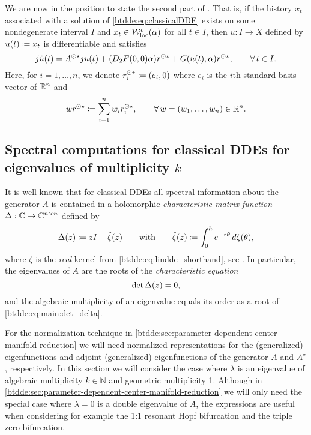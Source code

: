 We are now in the position to state the second part of \cite[Corollary
20]{Switching2019}. That is, if the history $x_t$ associated with a solution
of \cref{btdde:eq:classicalDDE} exists on some nondegenerate interval $I$ and $x_t \in
\mathcal{W}^c_{\text{loc}}(\alpha)$ for all $t \in I$, then $u : I \to X$ defined by $u(t) \coloneqq x_t$
is differentiable and satisfies
\[
  j\dot{u}(t) = A^{\odot\star}ju(t) + (D_2F(0,0)\alpha)r^{\odot\star} 
                    + G(u(t),\alpha)r^{\odot\star}, \qquad \forall\,t \in I.
\]
Here, for $i = 1,\ldots,n$, we denote $r^{\odot\star}_i \coloneqq (e_i, 0)$ where $e_i$ is the
$i$th standard basis vector of $\mathbb{R}^n$ and
\[
  w r^{\odot\star} \coloneqq \sum_{i=1}^n{w_ir^{\odot\star}_i}, \qquad 
    \forall\,w = (w_1,\ldots,w_n) \in \mathbb{R}^n.
\]

\subsection{Spectral computations for classical DDEs for eigenvalues of multiplicity \texorpdfstring{$k$}{k}}
It is well known that for classical DDEs all spectral information about the
generator $A$ is contained in a holomorphic \emph{characteristic matrix
function} $\Delta : \mathbb{C}
\to \mathbb{C}^{n \times n}$ defined by
\begin{equation}
\label{btdde:eq:CharMatrix}
  \Delta(z) \coloneqq zI - \hat{\zeta}(z) 
  \qquad \text{with} 
  \qquad \hat{\zeta}(z) \coloneqq \int_0^h{e^{-z\theta}\,d\zeta(\theta)},
\end{equation}
where $\zeta$ is the \emph{real} kernel from \cref{btdde:eq:lindde_shorthand}, see
\cite[Sections IV.4 and IV.5]{diekmann1995delay}. In particular, the
eigenvalues of $A$ are the roots of the \emph{characteristic equation}
\begin{equation}
  \label{btdde:eq:main:det_delta}
\operatorname{det}{\Delta(z)} = 0,
\end{equation}
and the algebraic multiplicity of an eigenvalue equals its order as a root of
\cref{btdde:eq:main:det_delta}.

For the normalization technique in \cref{btdde:sec:parameter-dependent-center-manifold-reduction}
we will need normalized representations for the (generalized) eigenfunctions and adjoint
(generalized) eigenfunctions of the generator $A$ and $A^\star$, respectively.
In this section we will consider the case where $\lambda$ is an eigenvalue of
algebraic multiplicity $k \in \mathbb N$ and geometric multiplicity 1.  
Although in \cref{btdde:sec:parameter-dependent-center-manifold-reduction} we will
only need the special case where $\lambda=0$ is a double eigenvalue of $A$, the
expressions are useful when considering for example the 1:1 resonant Hopf
bifurcation and the triple zero bifurcation.

